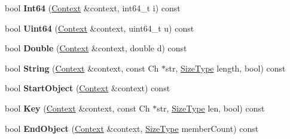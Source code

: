 \begin{DoxyCompactItemize}
\item 
bool {\bfseries Int64} (\hyperlink{structinternal_1_1SchemaValidationContext}{Context} \&context, int64\+\_\+t i) const \hypertarget{classinternal_1_1Schema_a4aa9da1fd0cb4c19dcaaeebbc8abf1dc}{}\label{classinternal_1_1Schema_a4aa9da1fd0cb4c19dcaaeebbc8abf1dc}

\item 
bool {\bfseries Uint64} (\hyperlink{structinternal_1_1SchemaValidationContext}{Context} \&context, uint64\+\_\+t u) const \hypertarget{classinternal_1_1Schema_afb862d9aee4bbe2aa99e0f44ec90b9d8}{}\label{classinternal_1_1Schema_afb862d9aee4bbe2aa99e0f44ec90b9d8}

\item 
bool {\bfseries Double} (\hyperlink{structinternal_1_1SchemaValidationContext}{Context} \&context, double d) const \hypertarget{classinternal_1_1Schema_aaf4ff1cb84013ff1a82ecb59cac38bfe}{}\label{classinternal_1_1Schema_aaf4ff1cb84013ff1a82ecb59cac38bfe}

\item 
bool {\bfseries String} (\hyperlink{structinternal_1_1SchemaValidationContext}{Context} \&context, const Ch $\ast$str, \hyperlink{rapidjson_8h_a5ed6e6e67250fadbd041127e6386dcb5}{Size\+Type} length, bool) const \hypertarget{classinternal_1_1Schema_a2bc7b83a75b84c241e733be9d356a2c4}{}\label{classinternal_1_1Schema_a2bc7b83a75b84c241e733be9d356a2c4}

\item 
bool {\bfseries Start\+Object} (\hyperlink{structinternal_1_1SchemaValidationContext}{Context} \&context) const \hypertarget{classinternal_1_1Schema_a907b715d5f817d337a3e18759f3ac0e4}{}\label{classinternal_1_1Schema_a907b715d5f817d337a3e18759f3ac0e4}

\item 
bool {\bfseries Key} (\hyperlink{structinternal_1_1SchemaValidationContext}{Context} \&context, const Ch $\ast$str, \hyperlink{rapidjson_8h_a5ed6e6e67250fadbd041127e6386dcb5}{Size\+Type} len, bool) const \hypertarget{classinternal_1_1Schema_af0855cd2ee33929513dd8b148bfa9017}{}\label{classinternal_1_1Schema_af0855cd2ee33929513dd8b148bfa9017}

\item 
bool {\bfseries End\+Object} (\hyperlink{structinternal_1_1SchemaValidationContext}{Context} \&context, \hyperlink{rapidjson_8h_a5ed6e6e67250fadbd041127e6386dcb5}{Size\+Type} member\+Count) const \hypertarget{classinternal_1_1Schema_ac66720d141d8c811cb2c71da05509618}{}\label{classinternal_1_1Schema_ac66720d141d8c811cb2c71da05509618}


\end{DoxyCompactItemize}
